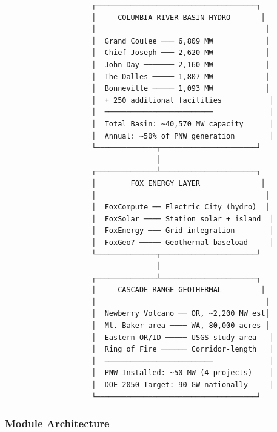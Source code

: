 \documentclass[11pt,letterpaper]{article}
\begin{document}
\begin{asciibox}
\begin{verbatim}
                    ┌─────────────────────────────────────┐
                    │     COLUMBIA RIVER BASIN HYDRO       │
                    │                                       │
                    │  Grand Coulee ─── 6,809 MW            │
                    │  Chief Joseph ─── 2,620 MW            │
                    │  John Day ─────── 2,160 MW            │
                    │  The Dalles ───── 1,807 MW            │
                    │  Bonneville ───── 1,093 MW            │
                    │  + 250 additional facilities           │
                    │  ─────────────────────────             │
                    │  Total Basin: ~40,570 MW capacity      │
                    │  Annual: ~50% of PNW generation        │
                    └──────────────┬──────────────────────┘
                                   │
                    ┌──────────────┴──────────────────────┐
                    │        FOX ENERGY LAYER              │
                    │                                       │
                    │  FoxCompute ── Electric City (hydro)  │
                    │  FoxSolar ──── Station solar + island  │
                    │  FoxEnergy ─── Grid integration        │
                    │  FoxGeo? ───── Geothermal baseload     │
                    └──────────────┬──────────────────────┘
                                   │
                    ┌──────────────┴──────────────────────┐
                    │     CASCADE RANGE GEOTHERMAL         │
                    │                                       │
                    │  Newberry Volcano ── OR, ~2,200 MW est│
                    │  Mt. Baker area ──── WA, 80,000 acres │
                    │  Eastern OR/ID ───── USGS study area   │
                    │  Ring of Fire ────── Corridor-length   │
                    │  ─────────────────────────             │
                    │  PNW Installed: ~50 MW (4 projects)    │
                    │  DOE 2050 Target: 90 GW nationally     │
                    └─────────────────────────────────────┘
\end{verbatim}
\end{asciibox}

\subsubsection{Module Architecture}
\end{document}
